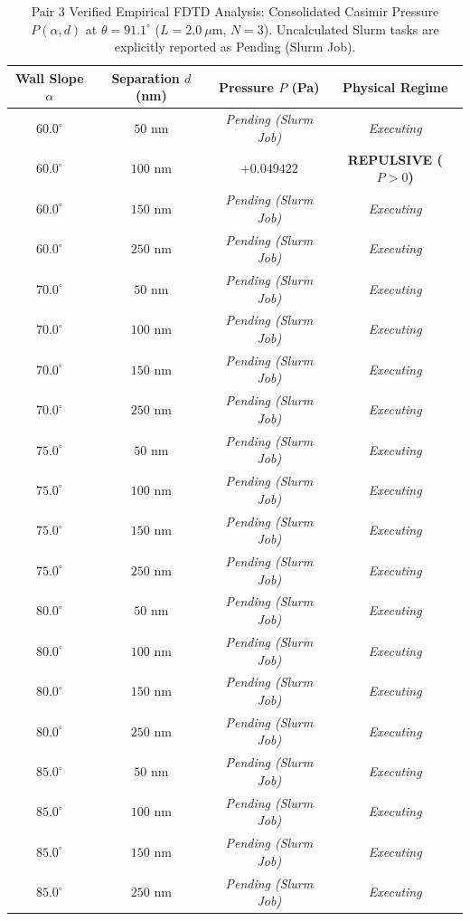 \begin{table}[h!]
\centering
\caption{Pair 3 Verified Empirical FDTD Analysis: Consolidated Casimir Pressure $P(\alpha, d)$ at $\theta = 91.1^\circ$ ($L=2.0\ \mu\text{m}$, $N=3$). Uncalculated Slurm tasks are explicitly reported as Pending (Slurm Job).}
\begin{tabular}{cccc}
\hline
\textbf{Wall Slope $\alpha$} & \textbf{Separation $d$ (nm)} & \textbf{Pressure $P$ (Pa)} & \textbf{Physical Regime} \\
\hline
$60.0^\circ$ & $50$ nm & \textit{Pending (Slurm Job)} & \textit{Executing} \\
$60.0^\circ$ & $100$ nm & $+0.049422$ & \textbf{REPULSIVE ($P>0$)} \\
$60.0^\circ$ & $150$ nm & \textit{Pending (Slurm Job)} & \textit{Executing} \\
$60.0^\circ$ & $250$ nm & \textit{Pending (Slurm Job)} & \textit{Executing} \\
$70.0^\circ$ & $50$ nm & \textit{Pending (Slurm Job)} & \textit{Executing} \\
$70.0^\circ$ & $100$ nm & \textit{Pending (Slurm Job)} & \textit{Executing} \\
$70.0^\circ$ & $150$ nm & \textit{Pending (Slurm Job)} & \textit{Executing} \\
$70.0^\circ$ & $250$ nm & \textit{Pending (Slurm Job)} & \textit{Executing} \\
$75.0^\circ$ & $50$ nm & \textit{Pending (Slurm Job)} & \textit{Executing} \\
$75.0^\circ$ & $100$ nm & \textit{Pending (Slurm Job)} & \textit{Executing} \\
$75.0^\circ$ & $150$ nm & \textit{Pending (Slurm Job)} & \textit{Executing} \\
$75.0^\circ$ & $250$ nm & \textit{Pending (Slurm Job)} & \textit{Executing} \\
$80.0^\circ$ & $50$ nm & \textit{Pending (Slurm Job)} & \textit{Executing} \\
$80.0^\circ$ & $100$ nm & \textit{Pending (Slurm Job)} & \textit{Executing} \\
$80.0^\circ$ & $150$ nm & \textit{Pending (Slurm Job)} & \textit{Executing} \\
$80.0^\circ$ & $250$ nm & \textit{Pending (Slurm Job)} & \textit{Executing} \\
$85.0^\circ$ & $50$ nm & \textit{Pending (Slurm Job)} & \textit{Executing} \\
$85.0^\circ$ & $100$ nm & \textit{Pending (Slurm Job)} & \textit{Executing} \\
$85.0^\circ$ & $150$ nm & \textit{Pending (Slurm Job)} & \textit{Executing} \\
$85.0^\circ$ & $250$ nm & \textit{Pending (Slurm Job)} & \textit{Executing} \\
\hline
\end{tabular}
\end{table}
